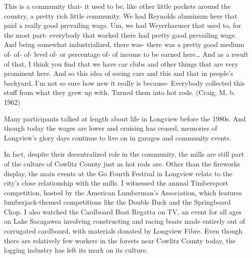 \begin{num_quote}
    This is a community that- it used to be, like other little pockets around the country, a pretty rich little community. We had Reynolds aluminum here that paid a really good prevailing wage. Um, we had Weyerhaeuser that used to, for the most part- everybody that worked there had pretty good prevailing wage. And being somewhat industrialized, there was- there was a pretty good medium of- of- of- level of- or percentage of- of income to be earned here… And as a result of that, I think you find that we have car clubs and other things that are very prominent here. And so this idea of seeing cars and this and that in people's backyard, I'm not so sure how new it really is because- Everybody collected this stuff from what they grew up with. Turned them into hot rods. (Craig, M, b. 1962)\label{quote:paid_well}
\end{num_quote}
Many participants talked at length about life in Longview before the 1980s. And though today the wages are lower and cruising has ceased, memories of Longview's glory days continue to live on in garages and community events.

In fact, despite their decentralized role in the community, the mills are still part of the culture of Cowlitz County just as hot rods are. Other than the fireworks display, the main events at the Go Fourth Festival in Longview relate to the city's close relationship with the mills. I witnessed the annual Timbersport competition, hosted by the American Lumberman's Association, which features lumberjack-themed competitions like the Double Buck and the Springboard Chop. I also watched the Cardboard Boat Regatta on TV, an event for all ages on Lake Sacagawea involving constructing and racing boats made entirely out of corrugated cardboard, with materials donated by Longview Fibre. Even though there are relatively few workers in the forests near Cowlitz County today, the logging industry has left its mark on its culture.

